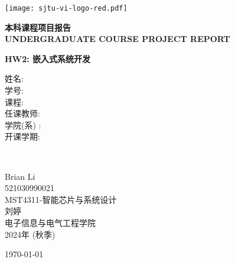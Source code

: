 \thispagestyle{empty}

\begin{titlepage}
	\begin{center}
		\texttt{[image: sjtu-vi-logo-red.pdf]}
		\vspace*{1cm}

		\huge
		\textbf{本科课程项目报告} \\
		\Large
		\textbf{UNDERGRADUATE COURSE PROJECT REPORT}

		\vspace{2cm}
		\LARGE
		\textbf{HW2: 嵌入式系统开发} \\

		\vfill

		\large
		\begin{minipage}{0.2\textwidth}
			\begin{flushleft}
				\Large
				姓\qquad 名: \\
				学\qquad 号: \\
				课\qquad 程: \\
				任课教师: \\
				学院(系) : \\
				开课学期: 
			\end{flushleft}
		\end{minipage}
		~
		\begin{minipage}{0.7\textwidth}
			\begin{center}
				\Large
				Brian Li \\
				521030990021 \\
				MST4311-智能芯片与系统设计 \\
				刘婷 \\
				电子信息与电气工程学院 \\
				2024年 (秋季)
			\end{center}
		\end{minipage}
		
		\vspace{1cm}
		\Large
		\today
	\end{center}
\end{titlepage}
